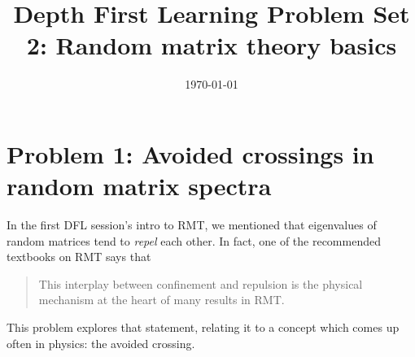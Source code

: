 \documentclass[a4paper]{article}
\title{Depth First Learning Problem Set 2: Random matrix theory basics}
\date{\today}
\begin{document}
\maketitle

\section*{Problem 1: Avoided crossings in random matrix spectra}

In the first DFL session's intro to RMT, we mentioned that eigenvalues of random matrices tend to \emph{repel} each other.  In fact, one of the recommended textbooks on RMT says that 
\begin{quote}
    This interplay between confinement and repulsion is the physical mechanism at the heart of many results in RMT.
\end{quote}

This problem explores that statement, relating it to a concept which comes up often in physics: the avoided crossing.  
\end{document}
